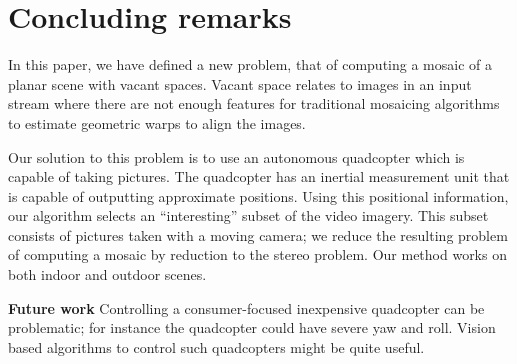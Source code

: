 \documentclass[10pt,twocolumn,letterpaper]{article}
\begin{document}


\section{Concluding remarks}

In this paper, we have defined a new problem, that of computing a
mosaic of a planar scene with vacant spaces.  Vacant space relates to images
in an input stream where there are not enough features for traditional
mosaicing algorithms to estimate geometric warps to align the images.

Our solution to this problem is to use an autonomous quadcopter which
is capable of taking pictures.  The quadcopter has an inertial
measurement unit that is capable of outputting approximate
positions. Using this positional information, our algorithm selects an
``interesting'' subset of the video imagery.  This subset consists of
pictures taken with a moving camera; we reduce the resulting
problem of computing a mosaic by reduction to the stereo problem.  Our
method works on both indoor and outdoor scenes.

{\bf Future work} Controlling a consumer-focused inexpensive
quadcopter can be problematic; for instance the quadcopter could have
severe yaw and roll.  Vision based algorithms to control such
quadcopters might be quite useful.




\end{document}
